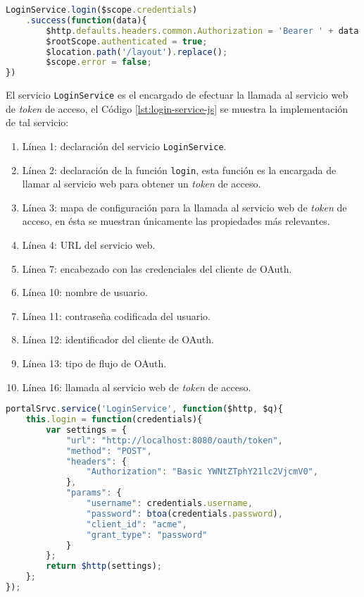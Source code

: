 \begin{lstlisting}[language=Javascript, caption={Petición de un \textit{token} de acceso.}, captionpos=b, label={lst:login-ctrl-js}]
LoginService.login($scope.credentials)
	.success(function(data){
		$http.defaults.headers.common.Authorization = 'Bearer ' + data.access_token;
		$rootScope.authenticated = true;
		$location.path('/layout').replace();
		$scope.error = false;
})
\end{lstlisting}

El servicio \texttt{LoginService} es el encargado de efectuar la llamada al servicio web de \textit{token} de acceso, el Código \ref{lst:login-service-js} se muestra la implementación de tal servicio:
\begin{enumerate}
	\item Línea 1: declaración del servicio \texttt{LoginService}.
	\item Línea 2: declaración de la función \texttt{login}, esta función es la encargada de llamar al servicio web para obtener un \textit{token} de acceso.
	\item Línea 3: mapa de configuración para la llamada al servicio web de \textit{token} de acceso, en ésta se muestran únicamente las propiedades más relevantes.
	\item Línea 4: URL del servicio web.
	\item Línea 7: encabezado con las credenciales del cliente de OAuth.
	\item Línea 10: nombre de usuario.
	\item Línea 11: contraseña codificada del usuario.
	\item Línea 12: identificador del cliente de OAuth.
	\item Línea 13: tipo de flujo de OAuth.
	\item Línea 16: llamada al servicio web de \textit{token} de acceso.
\end{enumerate}
\begin{lstlisting}[language=Javascript, caption={Servicio en \textit{AngularJS} para obtener un \textit{token} de acceso.}, captionpos=b, label={lst:login-service-js}]
portalSrvc.service('LoginService', function($http, $q){
	this.login = function(credentials){
		var settings = {
			"url": "http://localhost:8080/oauth/token",
			"method": "POST",
			"headers": {
				"Authorization": "Basic YWNtZTphY21lc2VjcmV0",
			},
			"params": {
				"username": credentials.username,
				"password": btoa(credentials.password),
				"client_id": "acme",
				"grant_type": "password"
			}
		};
		return $http(settings);
	};
});
\end{lstlisting}

